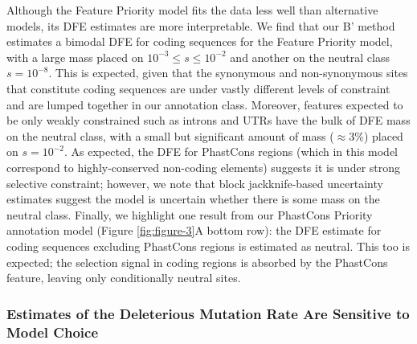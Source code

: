 \documentclass[11pt]{article}
\begin{document}
Although the Feature Priority model fits the data less well than alternative
models, its DFE estimates are more interpretable. We find that our B'
method estimates a bimodal DFE for coding sequences for the Feature Priority
model, with a large mass placed on $10^{-3} \le s \le 10^{-2}$ and another on
the neutral class $s=10^{-8}$. This is expected, given that the synonymous and
non-synonymous sites that constitute coding sequences are under vastly
different levels of constraint and are lumped together in our annotation class.
Moreover, features expected to be only weakly
constrained such as introns and UTRs have the bulk of DFE mass on the neutral
class, with a small but significant amount of mass ($\approx 3\%$) placed on
$s=10^{-2}$. As expected, the DFE for PhastCons regions (which in this model
correspond to highly-conserved non-coding elements) suggests it is under strong
selective constraint; however, we note that block jackknife-based uncertainty
estimates suggest the model is uncertain whether there is some mass on the
neutral class. Finally, we highlight one result from our PhastCons Priority
annotation model (Figure \ref{fig:figure-3}A bottom row): the DFE estimate for
coding sequences excluding PhastCons regions is estimated as neutral. This too
is expected; the selection signal in coding regions is absorbed by the
PhastCons feature, leaving only conditionally neutral sites.

\subsubsection*{Estimates of the Deleterious Mutation Rate Are Sensitive to Model Choice}
\end{document}
